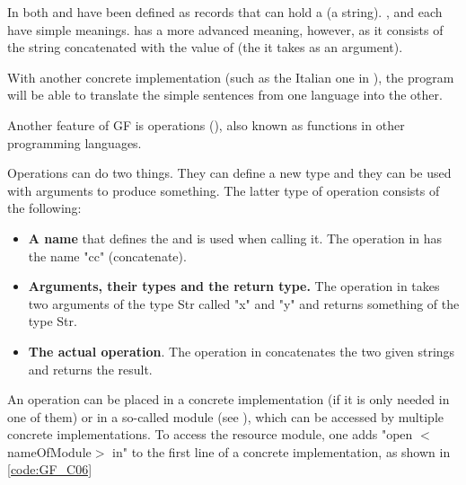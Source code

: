 In  both  and  have been defined as records that can hold a  (a string). ,  and  each have simple meanings.  has a more advanced meaning, however, as it consists of the string  concatenated with the value of  (the  it takes as an argument).



With another concrete implementation (such as the Italian one in ), the program will be able to translate the simple sentences from one language into the other. 

Another feature of GF is operations (), also known as functions in other programming languages.


Operations can do two things. They can define a new type and they can be used with arguments to produce something. The latter type of operation consists of the following:
\begin{itemize}
\item \textbf{A name} that defines the  and is used when calling it. The operation in  has the name "cc" (concatenate).

\item \textbf{Arguments, their types and the return type.} The operation in  takes two arguments of the type Str called "x" and "y" and returns something of the type Str.

\item \textbf{The actual operation}. The operation in  concatenates the two given strings and returns the result.
\end{itemize}


An operation can be placed in a concrete implementation (if it is only needed in one of them) or in a so-called  module (see ), which can be accessed by multiple concrete implementations. To access the resource module, one adds "open $<$nameOfModule$>$ in" to the first line of a concrete implementation, as shown in \ref{code:GF_C06}

